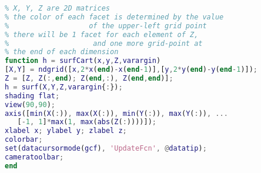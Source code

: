 \begin{lstlisting}[language=matlab, caption=surfCart.m]
% my version of surf()
% X, Y, Z are 2D matrices
% the color of each facet is determined by the value
%                   of the upper-left grid point
% there will be 1 facet for each element of Z,
%                    and one more grid-point at
% the end of each dimension
function h = surfCart(x,y,Z,varargin)
[X,Y] = ndgrid([x,2*x(end)-x(end-1)],[y,2*y(end)-y(end-1)]);
Z = [Z, Z(:,end); Z(end,:), Z(end,end)];
h = surf(X,Y,Z,varargin{:});
shading flat;
view(90,90);
axis([min(X(:)), max(X(:)), min(Y(:)), max(Y(:)), ...
   [-1, 1]*max(1, max(abs(Z(:))))]);
xlabel x; ylabel y; zlabel z;
colorbar;
set(datacursormode(gcf), 'UpdateFcn', @datatip);
cameratoolbar;
end
\end{lstlisting}
